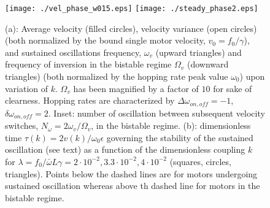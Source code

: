 \documentclass[prl,aps,twocolumn, floatfix, superscriptaddress,showpacs]{revtex4}
\begin{document}
\begin{figure}
 \texttt{[image: ./vel\_phase\_w015.eps]}
 \texttt{[image: ./steady\_phase2.eps]}
\caption{(a): Average velocity (filled circles), velocity variance (open circles) (both normalized by the bound single motor velocity, $v_0=f_0/\gamma$), and sustained oscillations frequency, $\omega_v$ (upward triangles) and frequency of inversion in the bistable regime $\Omega_v$ (downward triangles) (both normalized by  the hopping rate peak value $\omega_0$) upon variation of $k$. $\Omega_v$ has been magnified by a factor of $10$ for sake of clearness. Hopping rates are characterized by $\Delta\omega_{on,off}=-1$, $\delta\omega_{on,off}=2$. Inset: number of oscillation between subsequent velocity switches, $N_\omega=2\omega_v/\Omega_v$, in the bistable regime. (b): dimensionless time $\tau(k)=2 v(k)/\omega_0\epsilon$ governing the stability of the sustained oscillation (see text) as a function of the dimensionless coupling $k$ for $\lambda=f_0/\bar{\omega}
L \gamma=2\cdot10^{-2},3.3\cdot10^{-2},4\cdot10^{-2}$ (squares, circles, triangles). Points below the dashed lines are for  motors undergoing sustained oscillation whereas above th dashed line for motors in the bistable regime.}
\label{fig2}
\end{figure}
\end{document}
